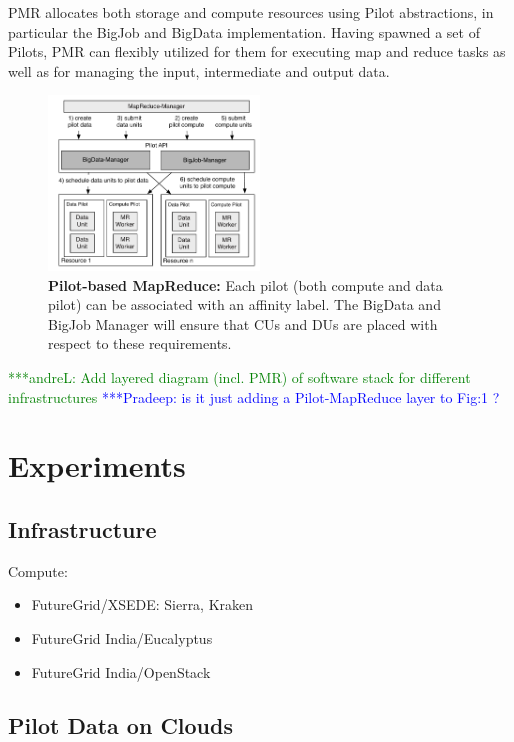 \documentclass[times]{cpeauth}
\newcommand{\alnote}[1]{ {\textcolor{green} { ***andreL: #1 }}}
\newcommand{\pmnote}[1]{ {\textcolor{blue} { ***Pradeep: #1 }}}
\newcommand{\alnote}[1]{}
\newcommand{\pmnote}[1]{}
\newcommand{\pilot}{Pilot\xspace}
\newcommand{\pilots}{Pilots\xspace}
\begin{document}
PMR allocates both storage and compute resources using \pilot abstractions, in
particular the BigJob and BigData implementation. Having spawned a set of
\pilots, PMR can flexibly utilized for them for executing map and reduce tasks
as well as for managing the input, intermediate and output data.


\begin{figure}[t]
	\centering
	\includegraphics[width=0.5\textwidth]{figures/mr-arch.pdf}
	\caption{\textbf{Pilot-based MapReduce:} Each pilot (both compute and data 
	pilot) can be associated with an affinity label. The BigData and BigJob 
	Manager will ensure that CUs and DUs are placed with respect to these 
	requirements.}
	\label{fig:figures_mapreduce-pilotdata}
\end{figure}


\alnote{Add layered diagram (incl. PMR) of software stack for different 
infrastructures}
\pmnote{ is it just adding a Pilot-MapReduce layer to Fig:1 ? }

\section{Experiments}

\subsection{Infrastructure}

Compute:
\begin{itemize}
	\item FutureGrid/XSEDE: Sierra, Kraken 
	\item FutureGrid India/Eucalyptus
	\item FutureGrid India/OpenStack
\end{itemize}

	
\subsection{Pilot Data on Clouds}
\end{document}
